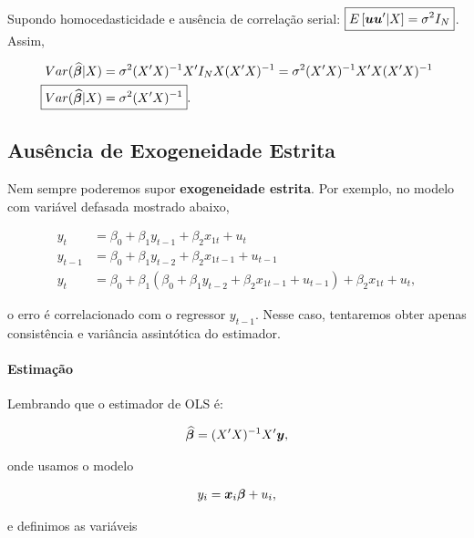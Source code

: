 \documentclass[11pt,oneside,a4paper]{article}
\numberwithin{equation}{section}
\begin{document}
Supondo homocedasticidade e ausência de correlação serial: 
$\boxed{ E \left[ \boldsymbol{u} \boldsymbol{u}'| X \right] = \sigma^2 I_{N} }$.
Assim, 

\begin{align*} 
Var ( \widehat{\mbs{\beta}} | X) 
&= \sigma^2 (X'X)^{-1}X' I_{N} X (X'X)^{-1}
= \sigma^2 (X'X)^{-1}X'X (X'X)^{-1}
\\
\Aboxed{ Var ( \widehat{\mbs{\beta}} | X) &= \sigma^2 (X'X)^{-1} }.
\end{align*}

\clearpage
\subsection*{Ausência de Exogeneidade Estrita}
Nem sempre poderemos supor \textbf{exogeneidade estrita}.
Por exemplo, no modelo com variável defasada mostrado abaixo,

\begin{align*}
y_{t} &= \beta_{0} + \beta_{1} y_{t-1} + \beta_{2} x_{1t} + u_{t}
\\
y_{t-1} &= \beta_{0} + \beta_{1} y_{t-2} + \beta_{2} x_{1t-1} + u_{t-1}
\\
y_{t} &= \beta_{0} +
\beta_{1} \left(  
\beta_{0} + \beta_{1} y_{t-2} + \beta_{2} x_{1t-1} + u_{t-1}
\right)
+
\beta_{2} x_{1t} + u_{t},
\end{align*}

\noindent
o erro é correlacionado com o regressor $y_{t-1}$.
Nesse caso, tentaremos obter apenas consistência e variância assintótica do estimador.

\paragraph{Estimação}

Lembrando que o estimador de OLS é:

\begin{align*}
\widehat{\boldsymbol{\beta}} = (X'X)^{-1}X'\boldsymbol{y},
\end{align*}

\noindent
onde usamos o modelo

\vspace{-1 em}
\begin{align*}
	y_{i} = \boldsymbol{x}_{i} \boldsymbol{\beta} + u_{i},
\end{align*}

e definimos as variáveis
\end{document}

